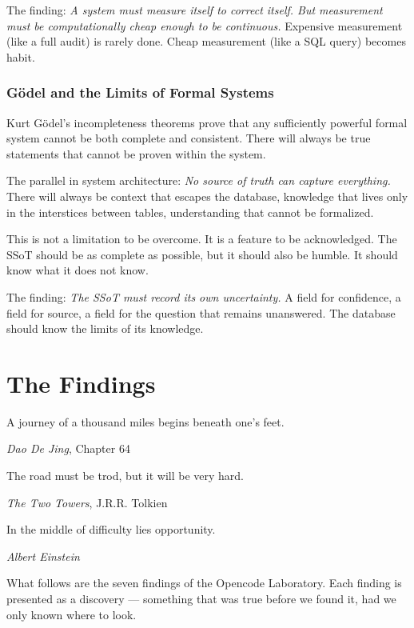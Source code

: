 \documentclass[12pt,a4paper,oneside]{book}
\begin{document}
The finding: \emph{A system must measure itself to correct itself. But measurement must be computationally cheap enough to be continuous.} Expensive measurement (like a full audit) is rarely done. Cheap measurement (like a SQL query) becomes habit.

\section{Gödel and the Limits of Formal Systems}

Kurt Gödel's incompleteness theorems prove that any sufficiently powerful formal system cannot be both complete and consistent. There will always be true statements that cannot be proven within the system.

The parallel in system architecture: \emph{No source of truth can capture everything.} There will always be context that escapes the database, knowledge that lives only in the interstices between tables, understanding that cannot be formalized.

This is not a limitation to be overcome. It is a feature to be acknowledged. The SSoT should be as complete as possible, but it should also be humble. It should know what it does not know.

The finding: \emph{The SSoT must record its own uncertainty.} A field for confidence, a field for source, a field for the question that remains unanswered. The database should know the limits of its knowledge.

\part{The Findings}
\label{part:findings}

\epigraph{A journey of a thousand miles begins beneath one's feet.}{\textit{Dao De Jing}, Chapter 64}

\epigraph{The road must be trod, but it will be very hard.}{\textit{The Two Towers}, J.R.R. Tolkien}

\epigraph{In the middle of difficulty lies opportunity.}{\textit{Albert Einstein}}

What follows are the seven findings of the Opencode Laboratory. Each finding is presented as a discovery --- something that was true before we found it, had we only known where to look.
\end{document}
